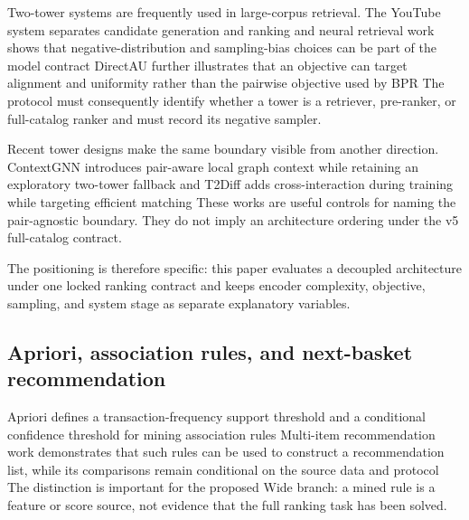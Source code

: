 Two-tower systems are frequently used in large-corpus retrieval. The YouTube
system separates candidate generation and ranking
\cite{covington2016_youtube} %
and neural retrieval work shows that negative-distribution and sampling-bias
choices can be part of the model contract
\cite{yi2019_ndr} %
DirectAU further illustrates that an objective can target alignment and
uniformity rather than the pairwise objective used by BPR
\cite{wang2022_directau} %
The protocol must consequently identify whether a tower is a retriever,
pre-ranker, or full-catalog ranker and must record its negative sampler.

Recent tower designs make the same boundary visible from another direction.
ContextGNN introduces pair-aware local graph context while retaining an
exploratory two-tower fallback
\cite{yuan2025_contextgnn} %
and T2Diff adds cross-interaction during training while targeting efficient
matching
\cite{wang2025_t2diff} %
These works are useful controls for naming the pair-agnostic boundary. They do
not imply an architecture ordering under the v5 full-catalog contract.

The positioning is therefore specific: this paper evaluates a decoupled
architecture under one locked ranking contract and keeps encoder complexity,
objective, sampling, and system stage as separate explanatory variables.

\subsection{Apriori, association rules, and next-basket recommendation}

Apriori defines a transaction-frequency support threshold and a conditional
confidence threshold for mining association rules
\cite{agrawal1994_apriori} %
Multi-item recommendation work demonstrates that such rules can be used to
construct a recommendation list, while its comparisons remain conditional on
the source data and protocol
\cite{ghoshal2014_multi_item_rules} %
The distinction is important for the proposed Wide branch: a mined rule is a
feature or score source, not evidence that the full ranking task has been
solved.

